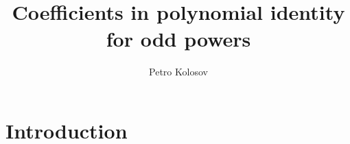 \documentclass[12pt,letterpaper,oneside,reqno]{amsart}
\title[Coefficients in polynomial identity for odd powers]
{Coefficients in polynomial identity for odd powers}
\author[Petro Kolosov]{Petro Kolosov}
\begin{document}
%        

    \maketitle

    \section{Introduction} \label{sec:introduction}
    

\end{document}
